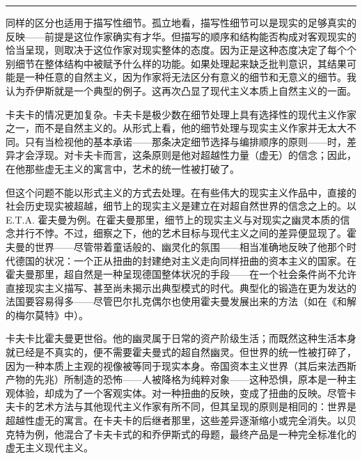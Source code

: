 \documentclass[12pt,a4paper]{article}
\begin{document}
\noindent\rule{\textwidth}{0.4pt}

\vspace{0.3em}



同样的区分也适用于描写性细节。孤立地看，描写性细节可以是现实的足够真实的反映——前提是这位作家确实有才华。但描写的顺序和结构能否构成对客观现实的恰当呈现，则取决于这位作家对现实整体的态度。因为正是这种态度决定了每个个别细节在整体结构中被赋予什么样的功能。如果处理起来缺乏批判意识，其结果可能是一种任意的自然主义，因为作家将无法区分有意义的细节和无意义的细节。我认为乔伊斯就是一个典型的例子。这再次凸显了现代主义本质上自然主义的一面。



卡夫卡的情况更加复杂。卡夫卡是极少数在细节处理上具有选择性的现代主义作家之一，而不是自然主义的。从形式上看，他的细节处理与现实主义作家并无太大不同。只有当检视他的基本承诺——那条决定细节选择与编排顺序的原则——时，差异才会浮现。对卡夫卡而言，这条原则是他对超越性力量（虚无）的信念；因此，在他那些虚无主义的寓言中，艺术的统一性被打破了。



但这个问题不能以形式主义的方式去处理。在有些伟大的现实主义作品中，直接的社会历史现实被超越，细节上的现实主义是建立在对超自然世界的信念之上的。以 E.T.A. 霍夫曼为例。在霍夫曼那里，细节上的现实主义与对现实之幽灵本质的信念并行不悖。不过，细察之下，他的艺术目标与现代主义之间的差异便显现了。霍夫曼的世界——尽管带着童话般的、幽灵化的氛围——相当准确地反映了他那个时代德国的状况：一个正从扭曲的封建绝对主义走向同样扭曲的资本主义的国家。在霍夫曼那里，超自然是一种呈现德国整体状况的手段——在一个社会条件尚不允许直接现实主义描写、甚至尚未揭示出典型模式的时代。典型化的锻造在更为发达的法国要容易得多——尽管巴尔扎克偶尔也使用霍夫曼发展出来的方法（如在《和解的梅尔莫特》中）。



卡夫卡比霍夫曼更世俗。他的幽灵属于日常的资产阶级生活；而既然这种生活本身就已经是不真实的，便不需要霍夫曼式的超自然幽灵。但世界的统一性被打碎了，因为一种本质上主观的视像被等同于现实本身。帝国资本主义世界（其后来法西斯产物的先兆）所制造的恐怖——人被降格为纯粹对象——这种恐惧，原本是一种主观体验，却成为了一个客观实体。对一种扭曲的反映，变成了扭曲的反映。尽管卡夫卡的艺术方法与其他现代主义作家有所不同，但其呈现的原则是相同的：世界是超越性虚无的寓言。在卡夫卡的后继者那里，这些差异逐渐缩小或完全消失。以贝克特为例，他混合了卡夫卡式的和乔伊斯式的母题，最终产品是一种完全标准化的虚无主义现代主义。
\par{}
\newpage
\end{document}
